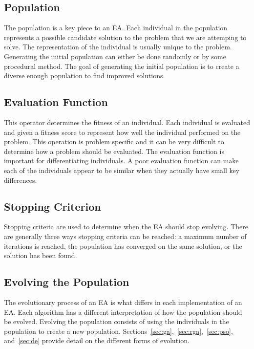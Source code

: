 \subsection{Population}

The population is a key piece to an EA. Each individual in the population represents a possible candidate solution to the problem that we are attemping to solve. The representation of the individual is usually unique to the problem. Generating the initial population can either be done randomly or by some procedural method. The goal of generating the initial population is to create a diverse enough population to find improved solutions.

\subsection{Evaluation Function}
\label{subsec:fitness-function}

This operator determines the fitness of an individual. Each individual is evaluated and given a fitness score to represent how well the individual performed on the problem. This operation is problem specific and it can be very difficult to determine how a problem should be evaluated. The evaluation function is important for differentiating individuals. A poor evaluation function can make each of the individuals appear to be similar when they actually have small key differences. 

\subsection{Stopping Criterion}

Stopping criteria are used to determine when the EA should stop evolving. There are generally three ways stopping criteria can be reached: a maximum number of iterations is reached, the population has converged on the same solution, or the solution has been found.

\subsection{Evolving the Population}

The evolutionary process of an EA is what differs in each implementation of an EA. Each algorithm has a different interpretation of how the population should be evolved. Evolving the population consists of using the individuals in the population to create a new population. Sections~\ref{sec:ga},~\ref{sec:rga},~\ref{sec:pso}, and~\ref{sec:de} provide detail on the different forms of evolution.